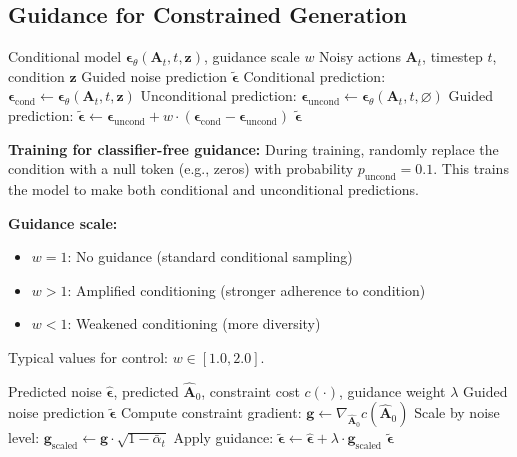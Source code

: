 \subsection{Guidance for Constrained Generation}
\label{subsec:guidance_algorithm}

\begin{algorithm}[H]
\caption{Classifier-Free Guidance for Diffusion Policy}
\label{alg:cfg_sampling}
\begin{algorithmic}[1]
\REQUIRE Conditional model $\boldsymbol{\epsilon}_\theta(\mathbf{A}_t, t, \mathbf{z})$, guidance scale $w$
\REQUIRE Noisy actions $\mathbf{A}_t$, timestep $t$, condition $\mathbf{z}$
\ENSURE Guided noise prediction $\tilde{\boldsymbol{\epsilon}}$
\STATE Conditional prediction: $\boldsymbol{\epsilon}_{\text{cond}} \gets \boldsymbol{\epsilon}_\theta(\mathbf{A}_t, t, \mathbf{z})$
\STATE Unconditional prediction: $\boldsymbol{\epsilon}_{\text{uncond}} \gets \boldsymbol{\epsilon}_\theta(\mathbf{A}_t, t, \varnothing)$
\STATE Guided prediction: $\tilde{\boldsymbol{\epsilon}} \gets \boldsymbol{\epsilon}_{\text{uncond}} + w \cdot (\boldsymbol{\epsilon}_{\text{cond}} - \boldsymbol{\epsilon}_{\text{uncond}})$
\RETURN $\tilde{\boldsymbol{\epsilon}}$
\end{algorithmic}
\end{algorithm}

\textbf{Training for classifier-free guidance:} During training, randomly replace the condition with a null token (e.g., zeros) with probability $p_{\text{uncond}} = 0.1$. This trains the model to make both conditional and unconditional predictions.

\textbf{Guidance scale:}
\begin{itemize}
    \item $w = 1$: No guidance (standard conditional sampling)
    \item $w > 1$: Amplified conditioning (stronger adherence to condition)
    \item $w < 1$: Weakened conditioning (more diversity)
\end{itemize}

Typical values for control: $w \in [1.0, 2.0]$.

\begin{algorithm}[H]
\caption{Constraint Guidance via Gradient}
\label{alg:constraint_guidance}
\begin{algorithmic}[1]
\REQUIRE Predicted noise $\hat{\boldsymbol{\epsilon}}$, predicted $\hat{\mathbf{A}}_0$, constraint cost $c(\cdot)$, guidance weight $\lambda$
\ENSURE Guided noise prediction $\tilde{\boldsymbol{\epsilon}}$
\STATE Compute constraint gradient: $\mathbf{g} \gets \nabla_{\hat{\mathbf{A}}_0} c(\hat{\mathbf{A}}_0)$
\STATE Scale by noise level: $\mathbf{g}_{\text{scaled}} \gets \mathbf{g} \cdot \sqrt{1-\bar{\alpha}_t}$
\STATE Apply guidance: $\tilde{\boldsymbol{\epsilon}} \gets \hat{\boldsymbol{\epsilon}} + \lambda \cdot \mathbf{g}_{\text{scaled}}$
\RETURN $\tilde{\boldsymbol{\epsilon}}$
\end{algorithmic}
\end{algorithm}

